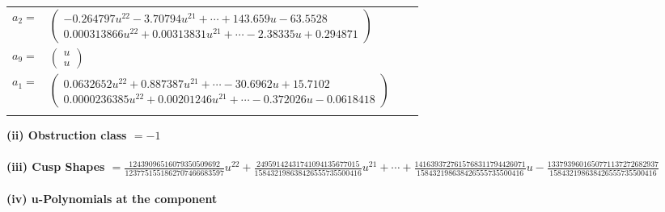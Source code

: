 \documentclass[1p]{elsarticle_modified}
\theoremstyle{definition}
\begin{document}
\begin{tabular}{m{7pt} m{180pt} m{7pt} m{180pt} }
\flushright $a_{2}=$&$\begin{pmatrix}-0.264797 u^{22}-3.70794 u^{21}+\cdots+143.659 u-63.5528\\0.000313866 u^{22}+0.00313831 u^{21}+\cdots-2.38335 u+0.294871\end{pmatrix}$ \\
\flushright $a_{9}=$&$\begin{pmatrix}u\\u\end{pmatrix}$ \\
\flushright $a_{1}=$&$\begin{pmatrix}0.0632652 u^{22}+0.887387 u^{21}+\cdots-30.6962 u+15.7102\\0.0000236385 u^{22}+0.00201246 u^{21}+\cdots-0.372026 u-0.0618418\end{pmatrix}$\\&\end{tabular}
\flushleft \textbf{(ii) Obstruction class $= -1$}\\~\\
\flushleft \textbf{(iii) Cusp Shapes $= \frac{12439096516079350509692}{1237751551862707466683597} u^{22}+\frac{24959142431741094135677015}{158432198638426555735500416} u^{21}+\cdots+\frac{1416393727615768311794426071}{158432198638426555735500416} u-\frac{1337939601650771137272682937}{158432198638426555735500416}$}\\~\\
\newpage\renewcommand{\arraystretch}{1}
\flushleft \textbf{(iv) u-Polynomials at the component}\newline \\
\end{document}
